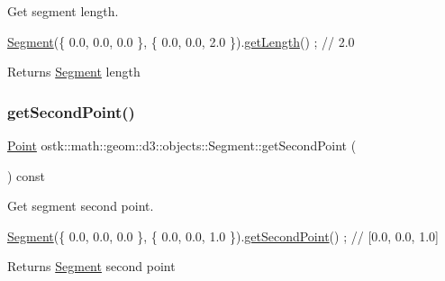 Get segment length. 


\begin{DoxyCode}
\hyperlink{classostk_1_1math_1_1geom_1_1d3_1_1objects_1_1_segment_aa2cb60ce06335a5f76120c658219494c}{Segment}(\{ 0.0, 0.0, 0.0 \}, \{ 0.0, 0.0, 2.0 \}).\hyperlink{classostk_1_1math_1_1geom_1_1d3_1_1objects_1_1_segment_a0f40747b4f8da2ef00b57ff0e4445968}{getLength}() ; \textcolor{comment}{// 2.0}
\end{DoxyCode}


\begin{DoxyReturn}{Returns}
\hyperlink{classostk_1_1math_1_1geom_1_1d3_1_1objects_1_1_segment}{Segment} length 
\end{DoxyReturn}
\mbox{\label{classostk_1_1math_1_1geom_1_1d3_1_1objects_1_1_segment_a194f50a9505400681ba0bb15ae999465}} 
\subsubsection{\texorpdfstring{get\+Second\+Point()}{getSecondPoint()}}
{\footnotesize\ttfamily \hyperlink{classostk_1_1math_1_1geom_1_1d3_1_1objects_1_1_point}{Point} ostk\+::math\+::geom\+::d3\+::objects\+::\+Segment\+::get\+Second\+Point (\begin{DoxyParamCaption}{ }\end{DoxyParamCaption}) const}



Get segment second point. 


\begin{DoxyCode}
\hyperlink{classostk_1_1math_1_1geom_1_1d3_1_1objects_1_1_segment_aa2cb60ce06335a5f76120c658219494c}{Segment}(\{ 0.0, 0.0, 0.0 \}, \{ 0.0, 0.0, 1.0 \}).\hyperlink{classostk_1_1math_1_1geom_1_1d3_1_1objects_1_1_segment_a194f50a9505400681ba0bb15ae999465}{getSecondPoint}() ; \textcolor{comment}{// [0.0, 0.0, 1.0]}
\end{DoxyCode}


\begin{DoxyReturn}{Returns}
\hyperlink{classostk_1_1math_1_1geom_1_1d3_1_1objects_1_1_segment}{Segment} second point 
\end{DoxyReturn}
\mbox{\label{classostk_1_1math_1_1geom_1_1d3_1_1objects_1_1_segment_a0a2acca7fc6eb6d957a33381ab8bc6b1}} 
